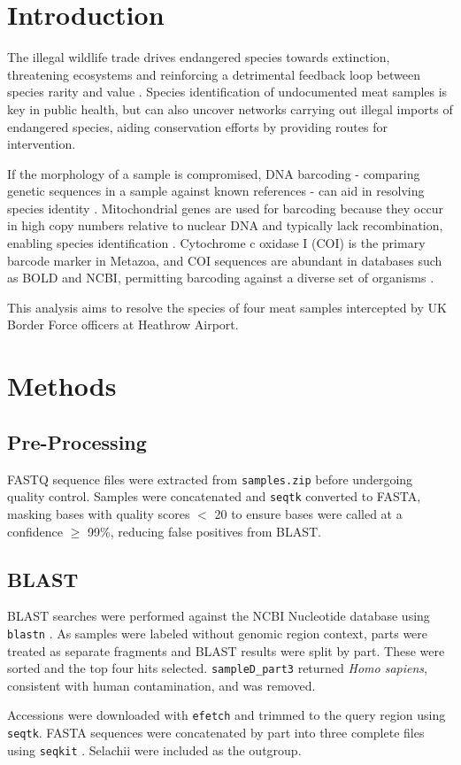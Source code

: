 \documentclass[11pt]{article}
\begin{document}
\section*{Introduction} %
\noindent The illegal wildlife trade drives endangered species towards extinction, threatening ecosystems and reinforcing a detrimental feedback loop between species rarity and value \citep{hughes2023ecological}. Species identification of undocumented meat samples is key in  public health, but can also uncover networks carrying out illegal imports of endangered species, aiding conservation efforts by providing routes for intervention.
\par If the morphology of a sample is compromised, DNA barcoding - comparing genetic sequences in a sample against known references - can aid in resolving species identity \citep{haye2012authentication, ahmed2022pragmatic}. Mitochondrial genes are used for barcoding because they occur in high copy numbers relative to nuclear DNA and typically lack recombination, enabling species identification \citep{dawnay2007validation}. Cytochrome c oxidase I (COI) is the primary barcode marker in Metazoa, and COI sequences are abundant in databases such as BOLD and NCBI, permitting barcoding against a diverse set of organisms \citep{porter2018over,ratnasingham2024bold}.
\par This analysis aims to resolve the species of four meat samples intercepted by UK Border Force officers at Heathrow Airport.



\section*{Methods} %
\subsection*{Pre-Processing}
FASTQ sequence files were extracted from \texttt{samples.zip} before undergoing quality control. Samples were concatenated and \texttt{seqtk} \citep{seqtk} converted to FASTA, masking bases with quality scores $<$ 20 to ensure bases were called at a confidence $\geq$ 99\%, reducing false positives from BLAST.

\subsection*{BLAST}
BLAST \citep{blast} searches were performed against the NCBI Nucleotide database using \texttt{blastn} \citep{blast+}. As samples were labeled without genomic region context, parts were treated as separate fragments and BLAST results were split by part. These were sorted and the top four hits selected. \texttt{sampleD\_part3} returned \textit{Homo sapiens}, consistent with human contamination, and was removed.
\par Accessions were downloaded with \texttt{efetch} \citep{efetch} and trimmed to the query region using \texttt{seqtk}. FASTA sequences were concatenated by part into three complete files using \texttt{seqkit} \citep{seqkit}. Selachii were included as the outgroup.
\end{document}
